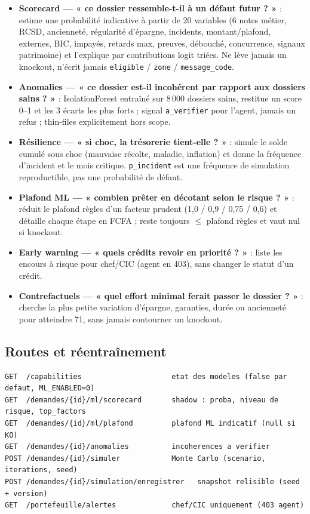 \documentclass[11pt,a4paper]{article}
\begin{document}
\begin{itemize}
  \item \textbf{Scorecard --- « ce dossier ressemble-t-il à un défaut futur ? »} : estime une probabilité indicative à partir de 20 variables (6 notes métier, RCSD, ancienneté, régularité d'épargne, incidents, montant/plafond, externes, BIC, impayés, retards max, preuves, débouché, concurrence, signaux patrimoine) et l'explique par contributions logit triées. Ne lève jamais un knockout, n'écrit jamais \texttt{eligible} / \texttt{zone} / \texttt{message\_code}.
  \item \textbf{Anomalies --- « ce dossier est-il incohérent par rapport aux dossiers sains ? »} : IsolationForest entraîné sur 8\,000 dossiers sains, restitue un score 0--1 et les 3 écarts les plus forts ; signal \texttt{a\_verifier} pour l'agent, jamais un refus ; thin-files explicitement hors scope.
  \item \textbf{Résilience --- « si choc, la trésorerie tient-elle ? »} : simule le solde cumulé sous choc (mauvaise récolte, maladie, inflation) et donne la fréquence d'incident et le mois critique. \texttt{p\_incident} est une fréquence de simulation reproductible, pas une probabilité de défaut.
  \item \textbf{Plafond ML --- « combien prêter en décotant selon le risque ? »} : réduit le plafond règles d'un facteur prudent (1,0 / 0,9 / 0,75 / 0,6) et détaille chaque étape en FCFA ; reste toujours $\leq$ plafond règles et vaut nul si knockout.
  \item \textbf{Early warning --- « quels crédits revoir en priorité ? »} : liste les encours à risque pour chef/CIC (agent en 403), sans changer le statut d'un crédit.
  \item \textbf{Contrefactuels --- « quel effort minimal ferait passer le dossier ? »} : cherche la plus petite variation d'épargne, garanties, durée ou ancienneté pour atteindre 71, sans jamais contourner un knockout.
\end{itemize}

\subsection{Routes et réentraînement}

\begin{lstlisting}
GET  /capabilities                     etat des modeles (false par defaut, ML_ENABLED=0)
GET  /demandes/{id}/ml/scorecard       shadow : proba, niveau de risque, top_factors
GET  /demandes/{id}/ml/plafond         plafond ML indicatif (null si KO)
GET  /demandes/{id}/anomalies          incoherences a verifier
POST /demandes/{id}/simuler            Monte Carlo (scenario, iterations, seed)
POST /demandes/{id}/simulation/enregistrer   snapshot relisible (seed + version)
GET  /portefeuille/alertes             chef/CIC uniquement (403 agent)
\end{lstlisting}
\end{document}
